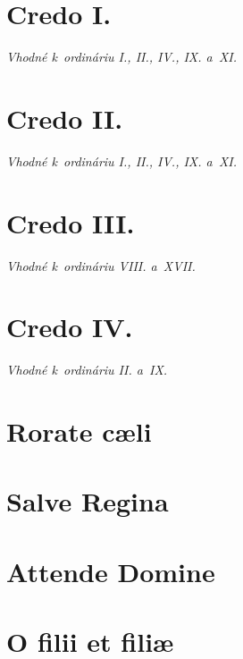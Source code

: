 \documentclass[12pt]{article} %
\newcommand{\info}[2]{{\textsc{#1}\hfill{\em #2}}\par\vspace{1em}}
\begin{document}
\section{Credo I.}
\info{}{Vhodné k~ordináriu I., II., IV., IX. a~XI.}




\section{Credo II.}
\info{}{Vhodné k~ordináriu I., II., IV., IX. a~XI.}




\section{Credo III.}
\info{}{Vhodné k~ordináriu VIII. a~XVII.}




\section{Credo IV.}
\info{}{Vhodné k~ordináriu II. a~IX.}



\newpage



\section{Rorate c\ae{}li}


\section{Salve Regina}


\section{Attende Domine}


\section{O filii et fili\ae}
\vspace{0.5em}

\end{document}
